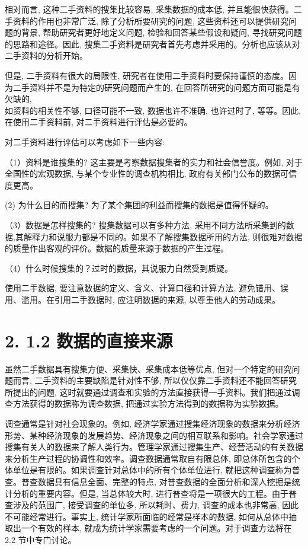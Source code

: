 \documentclass[10pt]{article}
\begin{document}
\begin{CJK*}{UTF8}{bsmi}
相对而言, 这种二手资料的搜集比较容易, 采集数据的成本低, 并且能很快获得。二手资料的作用也非常广泛, 除了分析所要研究的问题, 这些资料还可以提供研究问题的背景, 帮助研究者更好地定义问题, 检验和回答某些假设和疑问, 寻找研究问题的思路和途径。因此, 搜集二手资料是研究者首先考虑并采用的。分析也应该从对二手资料的分析开始。

但是, 二手资料有很大的局限性, 研究者在使用二手资料时要保持谨慎的态度。因为二手资料并不是为特定的研究问题而产生的, 在回答所研究的问题方面可能是有欠缺的,\\
如资料的相关性不够, 口径可能不一致, 数据也许不准确, 也许过时了, 等等。因此, 在使用二手资料前, 对二手资料进行评估是必要的。

对二手资料进行评估可以考虑如下一些内容:

（1）资料是谁搜集的? 这主要是考察数据搜集者的实力和社会信誉度。例如, 对于全国性的宏观数据, 与某个专业性的调查机构相比, 政府有关部门公布的数据可信度更高。

(2) 为什么目的而搜集? 为了某个集团的利益而搜集的数据是值得怀疑的。

（3）数据是怎样搜集的? 搜集数据可以有多种方法, 采用不同方法所采集到的数据,其解释力和说服力都是不同的。如果不了解搜集数据所用的方法, 则很难对数据的质量作出客观的评价。数据的质量来源于数据的产生过程。

（4）什么时候搜集的？过时的数据，其说服力自然受到质疑。

使用二手数据, 要注意数据的定义、含义、计算口径和计算方法, 避免错用、误用、滥用。在引用二手数据时, 应注明数据的来源, 以尊重他人的劳动成果。

\section*{2. 1.2 数据的直接来源}
虽然二手数据具有搜集方便、采集快、采集成本低等优点, 但对一个特定的研究问题而言, 二手资料的主要缺陷是针对性不够, 所以仅仅靠二手资料还不能回答研究所提出的问题, 这时就要通过调查和实验的方法直接获得一手资料。我们把通过调查方法获得的数据称为调查数据, 把通过实验方法得到的数据称为实验数据。

调查通常是针对社会现象的。例如, 经济学家通过搜集经济现象的数据来分析经济形势、某种经济现象的发展趋势、经济现象之间的相互联系和影响。社会学家通过搜集有关人的数据来了解人类行为。管理学家通过搜集生产、经营活动的有关数据来分析生产过程的协调性和效率。调查数据通常取自有限总体, 即总体所包含的个体单位是有限的。如果调查针对总体中的所有个体单位进行, 就把这种调查称为普查。普查数据具有信息全面、完整的特点, 对普查数据的全面分析和深人挖掘是统计分析的重要内容。但是, 当总体较大时, 进行普查将是一项很大的工程。由于普查涉及的范围广, 接受调查的单位多, 所以耗时、费力, 调查的成本也非常高, 因此不可能经常进行。事实上, 统计学家所面临的经常是样本的数据, 如何从总体中抽取出一个有效的样本, 就成为统计学家需要考虑的一个问题。对于调查方法将在 2.2 节中专门讨论。


\end{CJK*}
\end{document}
